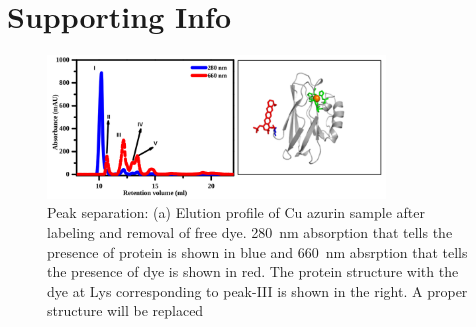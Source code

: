 \graphicspath{{chapters/c4_azurin_sm/si/}}
\section{Supporting Info}
\begin{figure}
  \centering
  \includegraphics[width=0.8\textwidth]{peak_separation}
  \makeatletter
  \renewcommand{\fnum@figure}{\figurename~S\thefigure}
  \makeatother
  \caption{Peak separation: (a) Elution profile of Cu azurin sample after labeling and removal of free dye.
  \SI{280}{\nm} absorption that tells the presence of protein is shown in blue and \SI{660}{\nm} absrption that tells the presence of  dye is shown in red.
  The protein structure with the dye at Lys corresponding to peak-III is shown in the right. 
  {A proper structure will be replaced}}
  \label{SIfig: peak_sep}
\end{figure}
